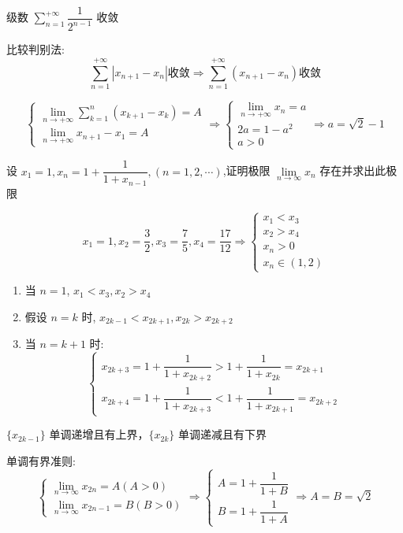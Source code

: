 \begin{solution}
\begin{anymark}[柯西列]
		级数 $\sum\limits_{n=1}^{+\infty}\dfrac{1}{2^{n-1}}$ 收敛

		比较判别法: 
		$$\sum\limits_{n=1}^{+\infty}|x_{n+1}-x_{n}|\text{收敛}\Rightarrow \sum\limits_{n=1}^{+\infty}(x_{n+1}-x_{n}) \text{收敛}$$ 
		
		$$\begin{cases}
			\lim\limits_{n\to +\infty}\sum\limits_{k=1}^{n}(x_{k+1}-x_{k}) = A\\
			\lim\limits_{n\to +\infty}x_{n+1} - x_{1} =A
		\end{cases}\Rightarrow 
		\begin{cases}
			\lim\limits_{n\to +\infty}x_{n} = a\\
			2a = 1-a^{2}\\
			a > 0
		\end{cases}\Rightarrow a = \sqrt{2} -1$$
	\end{anymark}
\end{solution}

\begin{proposition}
	设 $x_{1}=1,x_{n}=1+\dfrac{1}{1+x_{n-1}},(n=1,2,\cdots)$,证明极限 $\lim\limits_{n\rightarrow\infty}x_{n}$ 存在并求出此极限
\end{proposition}
\begin{solution}
	
	$$ x_{1}=1,x_{2}=\dfrac{3}{2},x_{3}=\dfrac{7}{5},x_{4}=\dfrac{17}{12}\Rightarrow 
	\begin{cases}
		x_{1}<x_{3} \\
		x_{2}>x_{4} \\
		x_{n} > 0\\
		x_{n}\in (1,2)
	\end{cases}$$
	\begin{enumerate}
		\item 当 $n = 1$, $x_{1} < x_{3}, x_{2} > x_{4}$
		\item 假设 $n = k$ 时, $x_{2k-1} < x_{2k+1}, x_{2k} > x_{2k+2}$
		\item 当 $n = k+1$ 时:
		$$\begin{cases}
			x_{2k+3}=1+\dfrac{1}{1+x_{2k+2}}>1+\dfrac{1}{1+x_{2k}}=x_{2k+1} \\
			x_{2k+4}=1+\dfrac{1}{1+x_{2k+3}}<1+\dfrac{1}{1+x_{2k+1}}=x_{2k+2}
		\end{cases}$$
	\end{enumerate}

	$\{x_{2k-1}\}$ 单调递增且有上界，$\{x_{2k}\}$ 单调递减且有下界
	
	单调有界准则:
	$$\begin{cases}
		\lim\limits_{n\to\infty}x_{2n} = A(A>0)\\
		\lim\limits_{n\to\infty}x_{2n-1}=B(B>0)
	\end{cases}\Rightarrow 
	\begin{cases}
		A=1+\dfrac{1}{1+B}\\
		B=1+\dfrac{1}{1+A}
	\end{cases}\Rightarrow A=B=\sqrt{2}$$
\end{solution}

